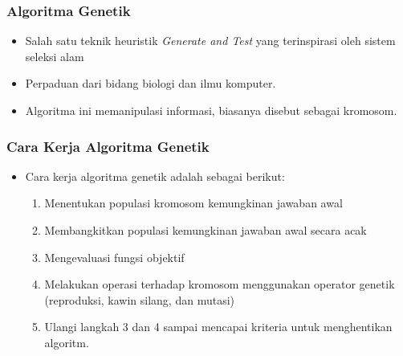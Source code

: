 \documentclass{beamer}
\begin{document}
\begin{frame}
\frametitle{Algoritma Genetik}
\begin{itemize}
\item Salah satu teknik heuristik \textit{Generate and Test} yang terinspirasi oleh sistem seleksi alam
\item Perpaduan dari bidang biologi dan ilmu komputer.
\item Algoritma ini memanipulasi informasi, biasanya disebut sebagai kromosom.
\end{itemize}
\end{frame}


\begin{frame}
\frametitle{Cara Kerja Algoritma Genetik}
\begin{itemize}
\item Cara kerja algoritma genetik adalah sebagai berikut:
\begin{enumerate}
\item Menentukan populasi kromosom kemungkinan jawaban awal
\item Membangkitkan populasi kemungkinan jawaban awal secara acak
\item Mengevaluasi fungsi objektif
\item Melakukan operasi terhadap kromosom menggunakan operator genetik (reproduksi, kawin silang, dan mutasi)
\item Ulangi langkah 3 dan 4 sampai mencapai kriteria untuk menghentikan algoritm.
\end{enumerate}
\end{itemize}
\end{frame}

\end{document}
